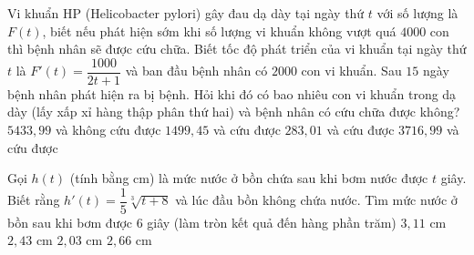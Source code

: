 \begin{ex}%
	Vi khuẩn HP (Helicobacter pylori) gây đau dạ dày tại ngày thứ $t$ với số lượng là $F(t)$, biết nếu phát hiện sớm khi số lượng vi khuẩn không vượt quá $4000$ con thì bệnh nhân sẽ được cứu chữa. Biết tốc độ phát triển của vi khuẩn tại ngày thứ $t$ là $F'(t)=\dfrac{1000}{2t+1}$ và ban đầu bệnh nhân có $2000$ con vi khuẩn. Sau $15$ ngày bệnh nhân phát hiện ra bị bệnh. Hỏi khi đó có bao nhiêu con vi khuẩn trong dạ dày (lấy xấp xỉ hàng thập phân thứ hai) và bệnh nhân có cứu chữa được không?
	\choice
	{$5433{,}99$ và không cứu được}
	{$1499{,}45$ và cứu được}
	{$283{,}01$ và cứu được}
	{\True $3716{,}99$ và cứu được}
\end{ex}

\begin{ex}%
	Gọi $h(t)$ (tính bằng cm) là mức nước ở bồn chứa sau khi bơm nước được $t$ giây. Biết rằng $h'(t)=\dfrac{1}{5}\sqrt[3]{t+8}$ và lúc đầu bồn không chứa nước. Tìm mức nước ở bồn sau khi bơm được $6$ giây (làm tròn kết quả đến hàng phần trăm)
	\choice
	{$3{,}11$ cm}
	{$2{,}43$ cm}
	{$2{,}03$ cm}
	{\True $2{,}66$ cm}
\end{ex}

